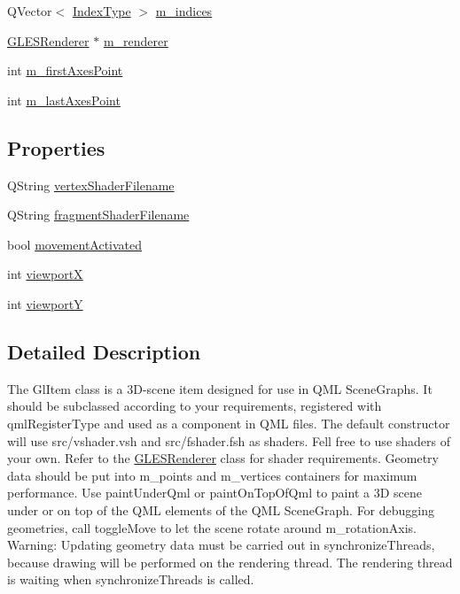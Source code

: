 \begin{DoxyCompactItemize}
\item 
Q\+Vector$<$ \mbox{\hyperlink{gldefines_8h_af3c748960f29c42e5b7f1dc449ab66ff}{Index\+Type}} $>$ \mbox{\hyperlink{class_g_l_item_a8468276169e38c20e55eaf390a8e81c1}{m\+\_\+indices}}
\item 
\mbox{\hyperlink{class_g_l_e_s_renderer}{G\+L\+E\+S\+Renderer}} $\ast$ \mbox{\hyperlink{class_g_l_item_aa23f231003107c152ad26180e02dd428}{m\+\_\+renderer}}
\item 
int \mbox{\hyperlink{class_g_l_item_a770f91579acd280f401ac242c1800957}{m\+\_\+first\+Axes\+Point}}
\item 
int \mbox{\hyperlink{class_g_l_item_a08d819a2e323706eaebda482fa0c06c2}{m\+\_\+last\+Axes\+Point}}
\end{DoxyCompactItemize}
\subsection*{Properties}
\begin{DoxyCompactItemize}
\item 
Q\+String \mbox{\hyperlink{class_g_l_item_aa18b199e7c5d8a1c0a288dc45b12c8c6}{vertex\+Shader\+Filename}}
\item 
Q\+String \mbox{\hyperlink{class_g_l_item_a81e33a49ac37afcc322c703b55cd6071}{fragment\+Shader\+Filename}}
\item 
bool \mbox{\hyperlink{class_g_l_item_aad3da5ba5d67c4f44430e6ed3b2cc8bc}{movement\+Activated}}
\item 
int \mbox{\hyperlink{class_g_l_item_a91dc1c10352ee468fd0804162967a2c5}{viewportX}}
\item 
int \mbox{\hyperlink{class_g_l_item_a2703487de4b0843c256861f914b57208}{viewportY}}
\end{DoxyCompactItemize}


\subsection{Detailed Description}
The Gl\+Item class is a 3D-\/scene item designed for use in Q\+ML Scene\+Graphs. It should be subclassed according to your requirements, registered with qml\+Register\+Type and used as a component in Q\+ML files. The default constructor will use src/vshader.\+vsh and src/fshader.\+fsh as shaders. Fell free to use shaders of your own. Refer to the \mbox{\hyperlink{class_g_l_e_s_renderer}{G\+L\+E\+S\+Renderer}} class for shader requirements. Geometry data should be put into m\+\_\+points and m\+\_\+vertices containers for maximum performance. Use paint\+Under\+Qml or paint\+On\+Top\+Of\+Qml to paint a 3D scene under or on top of the Q\+ML elements of the Q\+ML Scene\+Graph. For debugging geometries, call toggle\+Move to let the scene rotate around m\+\_\+rotation\+Axis. Warning\+: Updating geometry data must be carried out in synchronize\+Threads, because drawing will be performed on the rendering thread. The rendering thread is waiting when synchronize\+Threads is called. 




